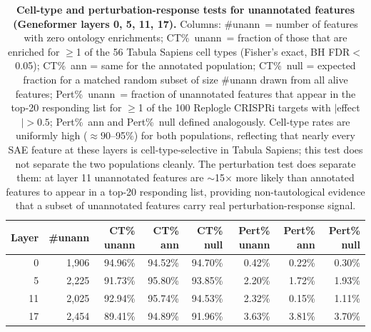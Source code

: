 \documentclass[onecolumn]{article}
\begin{document}
\begin{table}[H]
\centering
\caption{\textbf{Cell-type and perturbation-response tests for unannotated features (Geneformer layers 0, 5, 11, 17).} Columns: \#unann~= number of features with zero ontology enrichments; CT\%~unann~= fraction of those that are enriched for $\geq$1 of the 56 Tabula Sapiens cell types (Fisher's exact, BH FDR$<$0.05); CT\%~ann = same for the annotated population; CT\%~null = expected fraction for a matched random subset of size \#unann drawn from all alive features; Pert\%~unann~= fraction of unannotated features that appear in the top-20 responding list for $\geq$1 of the 100 Replogle CRISPRi targets with $|$effect$| > 0.5$; Pert\%~ann and Pert\%~null defined analogously. Cell-type rates are uniformly high ($\approx 90$--95\%) for both populations, reflecting that nearly every SAE feature at these layers is cell-type-selective in Tabula Sapiens; this test does not separate the two populations cleanly. The perturbation test does separate them: at layer 11 unannotated features are $\sim$15$\times$ more likely than annotated features to appear in a top-20 responding list, providing non-tautological evidence that a subset of unannotated features carry real perturbation-response signal.}
\label{tab:unannotated_new}
\smallskip
\small
\begin{tabular}{rrrrrrrr}
\toprule
Layer & \#unann & CT\% unann & CT\% ann & CT\% null & Pert\% unann & Pert\% ann & Pert\% null \\
\midrule
0  & 1{,}906 & 94.96\% & 94.52\% & 94.70\% & 0.42\% & 0.22\% & 0.30\% \\
5  & 2{,}225 & 91.73\% & 95.80\% & 93.85\% & 2.20\% & 1.72\% & 1.93\% \\
11 & 2{,}025 & 92.94\% & 95.74\% & 94.53\% & 2.32\% & 0.15\% & 1.11\% \\
17 & 2{,}454 & 89.41\% & 94.89\% & 91.96\% & 3.63\% & 3.81\% & 3.70\% \\
\bottomrule
\end{tabular}
\end{table}
\end{document}
